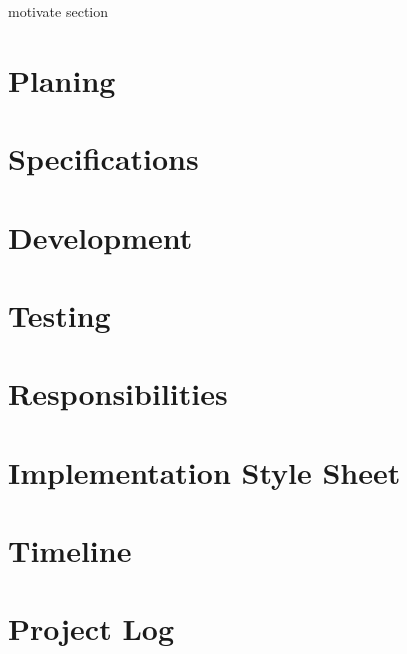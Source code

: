 motivate section

\section{Planing}
\section{Specifications}
\section{Development}
\section{Testing}
\section{Responsibilities}
\section{Implementation Style Sheet}
\section{Timeline}
\section{Project Log}
